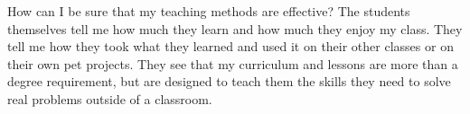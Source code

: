 \documentclass[a4paper]{article}
\begin{document}
How can I be sure that my teaching methods are effective?
The students themselves tell me how much they learn and how much they enjoy my class.
They tell me how they took what they learned and used it on their other classes or on their own pet projects.
They see that my curriculum and lessons are more than a degree requirement, but are designed to teach them the skills they need to solve real problems outside of a classroom.
\end{document}
